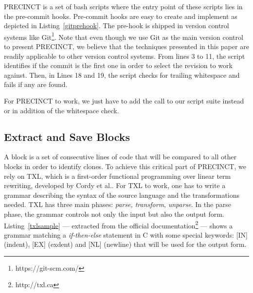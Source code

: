 \documentclass[conference]{IEEEtran}
\begin{document}
PRECINCT is a set of bash scripts where the entry point of these scripts lies in the pre-commit hooks. Pre-commit hooks are easy to create and implement as depicted in Listing~\ref{gitprehook}.
The pre-hook is shipped in version control systems like Git\footnote{https://git-scm.com/}.
Note that even though we use Git as the main version control to present PRECINCT, we believe that the techniques presented in this paper are readily applicable to other version control systems.
From lines 3 to 11, the script identifies if the commit is the first one in order to select the revision to work against.
Then, in Lines 18 and 19, the script checks for trailing whitespace and fails if any are found.

\noindent\begin{minipage}{0.90\linewidth}

  

\end{minipage}

For PRECINCT to work, we just have to add the call to our script suite instead or in addition of the whitespace check.

\subsection{Extract and Save Blocks}
\label{sub:Extract and Save Blocks}

A block is a set of consecutive lines of code that will be compared to all other blocks in order to identify clones.
To achieve this critical part of PRECINCT, we rely on TXL\cite{Cordy2006a}, which is a first-order functional programming over linear term rewriting, developed by Cordy et al.\cite{Cordy2006a}.
For TXL to work, one has to write a grammar describing the syntax of the source  language and the transformations needed. TXL has three main phases: \textit{parse, transform}, \textit{unparse}.
In the parse phase, the grammar controls not only the input but also the output form.
Listing~\ref{txlsample} --- extracted from the official documentation\footnote{http://txl.ca} --- shows a grammar matching a \textit{if-then-else} statement in C with some special keywords: [IN] (indent), [EX] (exdent) and [NL] (newline) that will be used for the output form.

\noindent\begin{minipage}{0.90\linewidth}

  

\end{minipage}
\end{document}
